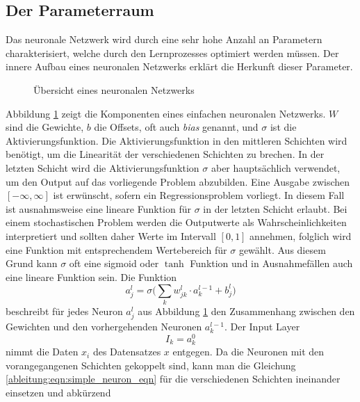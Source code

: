 \subsection{Der Parameterraum}
Das neuronale Netzwerk wird durch eine sehr hohe Anzahl an Parametern
charakterisiert, welche durch den Lernprozesses optimiert werden
müssen.
Der innere Aufbau eines neuronalen Netzwerks erklärt die Herkunft
dieser Parameter.
\begin{figure}
	\begin{center}
		
		\caption{Übersicht eines neuronalen Netzwerks}
		\label{ableitung:fig:neuronal_network}
	\end{center}
\end{figure} 
Abbildung \ref{ableitung:fig:neuronal_network} zeigt die Komponenten eines einfachen neuronalen Netzwerks.
$W$ sind die Gewichte, $b$ die Offsets, oft auch \textit{bias} genannt, und $\sigma$ ist die Aktivierungsfunktion.
%
%
%
Die Aktivierungsfunktion in den mittleren Schichten wird benötigt, um die Linearität der verschiedenen Schichten zu brechen.
%
In der letzten Schicht wird die Aktivierungsfunktion $\sigma$ aber hauptsächlich verwendet, um den Output auf das vorliegende Problem abzubilden.
Eine Ausgabe zwischen $[-\infty, \infty]$ ist erwünscht, sofern ein Regressionsproblem vorliegt.
In diesem Fall ist ausnahmsweise eine lineare Funktion für $\sigma$
in der letzten Schicht erlaubt.
Bei einem stochastischen Problem werden die Outputwerte als
Wahrscheinlichkeiten interpretiert und sollten daher Werte im Intervall
$[0,1]$ annehmen, folglich wird eine Funktion mit entsprechendem
Wertebereich für $\sigma$ gewählt.
Aus diesem Grund kann $\sigma$ oft eine  sigmoid oder $\tanh$
Funktion und in Ausnahmefällen auch eine lineare Funktion sein.
Die Funktion
\begin{equation}
a^{l}_{j} = \sigma \biggl( \sum\limits_{k}w^{l}_{jk} \cdot a^{l-1}_{k}+b^{l}_{j} \biggr)
\label{ableitung:eqn:simple_neuron_eqn}
\end{equation}
beschreibt für jedes Neuron $a^{l}_{j}$ aus Abbildung
\ref{ableitung:fig:neuronal_network} den Zusammenhang zwischen den
Gewichten und den vorhergehenden Neuronen $a^{l-1}_{k}$.
%
Der Input Layer 
\begin{equation}
I_k = a_{k}^{0}
\end{equation}
nimmt die Daten $x_i$ des Datensatzes $x$ entgegen.
Da die Neuronen mit den vorangegangenen Schichten gekoppelt sind, kann man die Gleichung \eqref{ableitung:eqn:simple_neuron_eqn} für die verschiedenen Schichten ineinander einsetzen und abkürzend
